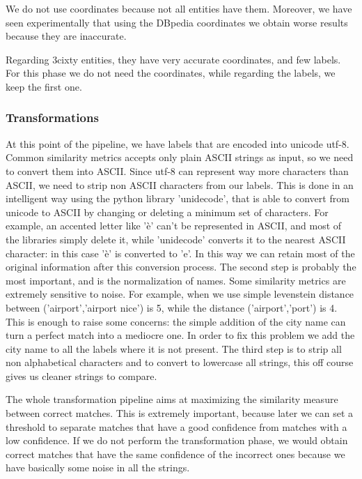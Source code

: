 \documentclass[paper=a4, fontsize=11pt]{scrartcl}
\begin{document}
We do not use coordinates because not all entities have them. Moreover, we have seen experimentally that using the DBpedia coordinates we obtain worse results because they are inaccurate.


Regarding 3cixty entities, they have very accurate coordinates, and few labels. For this phase we do not need the coordinates, while regarding the labels, we keep the first one.

\subsubsection{Transformations}
At this point of the pipeline, we have labels that are encoded into unicode utf-8. Common similarity metrics accepts only plain ASCII strings as input, so we need to convert them into ASCII. Since utf-8 can represent way more characters than ASCII, we need to strip non ASCII characters from our labels. This is done in an intelligent way using the python library 'unidecode', that is able to convert from unicode to ASCII by changing or deleting a minimum set of characters. For example, an accented letter like 'è' can't be represented in ASCII, and most of the libraries simply delete it, while 'unidecode' converts it to the nearest ASCII character: in this case 'è' is converted to 'e'. In this way we can retain most of the original information after this conversion process.
The second step is probably the most important, and is the normalization of names. Some similarity metrics are extremely sensitive to noise. For example, when we use simple levenstein distance between ('airport','airport nice') is 5, while the distance ('airport','port') is 4. This is enough to raise some concerns: the simple addition of the city name can turn a perfect match into a mediocre one. In order to fix this problem we add the city name to all the labels where it is not present.
The third step is to strip all non alphabetical characters and to convert to lowercase all strings, this off course gives us cleaner strings to compare.

The whole transformation pipeline aims at maximizing the similarity measure between correct matches. This is extremely important, because later we can set a threshold to separate matches that have a good confidence from matches with a low confidence. If we do not perform the transformation phase, we would obtain correct matches that have the same confidence of the incorrect ones because we have basically some noise in all the strings.
\end{document}
